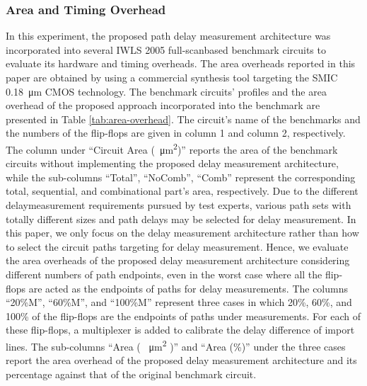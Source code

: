 \subsubsection{Area and Timing Overhead}
In this experiment, the proposed path delay measurement architecture was incorporated into several IWLS 2005 full-scanbased benchmark circuits to evaluate its hardware and timing overheads. The area overheads reported in this paper are obtained by using a commercial synthesis tool targeting the SMIC \SI{0.18}{\micro\metre} CMOS technology. The benchmark circuits’ profiles and the area overhead of the proposed approach incorporated into the benchmark are presented in Table \ref{tab:area-overhead}. The circuit’s name of the benchmarks and the numbers of the flip-flops are given in column 1 and column 2, respectively. The column under “Circuit Area (\SI{}{\micro\metre^{2}})” reports the area of the benchmark circuits without implementing the proposed delay measurement architecture, while the sub-columns “Total”, “NoComb”, “Comb” represent the corresponding total, sequential, and combinational part’s area, respectively. Due to the different delaymeasurement requirements pursued by test experts, various path sets with totally different sizes and path delays may be selected for delay measurement. In this paper, we only focus on the delay measurement architecture rather than how to select the circuit paths targeting for delay measurement. Hence, we evaluate the area overheads of the proposed delay measurement architecture considering different numbers of path endpoints, even in the worst case where all the flip-flops are acted as the endpoints of paths for delay measurements. The columns “20\%M”, “60\%M”, and “100\%M” represent three cases in which 20\%, 60\%, and 100\% of the flip-flops are the endpoints of paths under measurements. For each of these flip-flops, a multiplexer is added to calibrate the delay difference of import lines. The sub-columns “Area ( \SI{}{\micro\metre^2} )” and “Area (\%)” under the three cases report the area overhead of the proposed delay measurement architecture and its percentage against that of the original benchmark circuit. 

